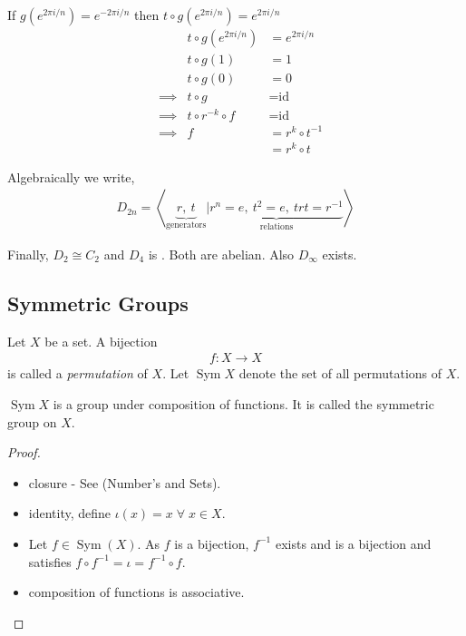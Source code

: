If \(g(e^{2 \pi i /n}) = e^{-2 \pi i /n}\) then \(t \circ g(e^{2 \pi i / n}) = e^{2 \pi i / n}\)
\begin{align*}
    && t \circ g(e^{2 \pi i / n}) &= e^{2 \pi i / n} \\
    && t \circ g (1) &= 1 \\
    && t \circ g (0) &= 0 \\
    &\implies & t \circ g &= \text{id} \\
    &\implies & t \circ r^{-k} \circ f &= \text{id} \\
    &\implies & f &= r^{k} \circ t^{-1} \\
    && &= r^k \circ t
\end{align*}

Algebraically we write,
\begin{align*}
    D_{2n} = \left\langle \underbrace{r,\ t}_\text{generators} | \underbrace{r^n = e,\ t^2 = e,\ trt = r^{-1}}_\text{relations} \right\rangle 
\end{align*}

Finally, \(D_2 \cong C_2\) and \(D_4\) is .
Both are abelian.
Also \(D_\infty\) exists.

\hypertarget{symmetric-groups}{%
\subsection{Symmetric Groups}\label{symmetric-groups}}

\begin{definition}[permutation] \label{def:permutation}
Let \(X\) be a set.
A bijection \begin{align*}
    f: X \to X
\end{align*} is called a \emph{permutation} of \(X\).
Let \(\operatorname{Sym} X\) denote the set of all permutations of \(X\).
\end{definition} 

\begin{proposition}
\(\operatorname{Sym} X\) is a group under composition of functions. It is called the symmetric group on \(X\).
\end{proposition}

\begin{proof} \mbox{}
\begin{itemize}
\item
  closure - See  (Number's and Sets).
\item
  identity, define \(\iota (x) = x \; \forall \; x \in X\).
\item
  Let \(f \in \operatorname{Sym}(X)\).
  As \(f\) is a bijection, \(f^{-1}\) exists and is a bijection and satisfies \(f \circ f^{-1} = \iota = f^{-1} \circ f\).
\item
  composition of functions is associative.
\end{itemize}
\end{proof}

